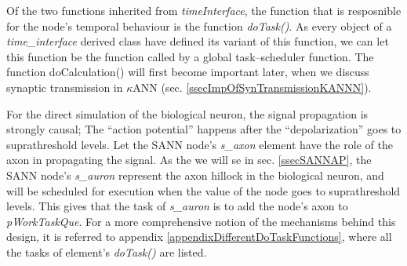 	Of the two functions inherited from \emph{timeInterface}, %
		the function that is resposnible for the node's temporal behaviour is the function \emph{doTask()}.
	As every object of a \emph{time\_interface} derived class have defined its variant of this function, we can let this function be the function called by a global task--scheduler function. %
	The function doCalculation() will first become important later, when we discuss synaptic transmission in $\kappa$ANN (sec. \ref{ssecImpOfSynTransmissionKANNN}). 
	 



	For the direct simulation of the biological neuron, the signal propagation is strongly causal; The ``action potential'' happens after the ``depolarization'' goes to suprathreshold levels.
	Let the SANN node's \emph{s\_axon} element have the role of the axon in propagating the signal.
	As the we will se in sec. \ref{ssecSANNAP}, the SANN node's \emph{s\_auron} represent the axon hillock in the biological neuron, and will be scheduled for execution when the value of the node goes to suprathreshold levels.
	This gives that the task of \emph{s\_auron} is to add the node's axon to \emph{pWorkTaskQue}.
	For a more comprehensive notion of the mechanisms behind this design, it is referred to appendix \ref{appendixDifferentDoTaskFunctions}, where all the tasks of element's \emph{doTask()} are listed.

